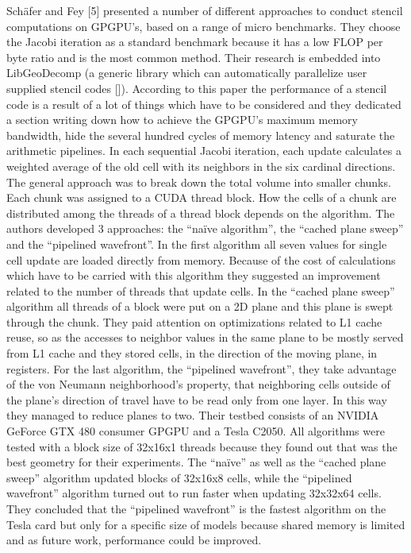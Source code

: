 Schäfer and Fey [5] presented a number of different approaches to conduct stencil computations on GPGPU’s, based on a range of micro benchmarks. They choose the Jacobi iteration as a standard benchmark because it has a low FLOP per byte ratio and is the most common method. Their research is embedded into LibGeoDecomp (a generic library which can automatically parallelize user supplied stencil codes []). According to this paper the performance of a stencil code is a result of a lot of things which have to be considered and they dedicated a section writing down how to achieve the GPGPU’s maximum memory bandwidth, hide the several hundred cycles of memory latency and saturate the arithmetic pipelines. In each sequential Jacobi iteration, each update calculates a weighted average of the old cell with its neighbors in the six cardinal directions. The general approach was to break down the total volume into smaller chunks. Each chunk was assigned to a CUDA thread block. How the cells of a chunk are distributed among the threads of a thread block depends on the algorithm. The authors developed 3 approaches: the “naïve algorithm”, the “cached plane sweep” and the “pipelined wavefront”. In the first algorithm all seven values for single cell update are loaded directly from memory. Because of the cost of calculations which have to be carried with this algorithm they suggested an improvement related to the number of threads that update cells. In the “cached plane sweep” algorithm all threads of a block were put on a 2D plane and this plane is swept through the chunk. They paid attention on optimizations related to L1 cache reuse, so as the accesses to neighbor values in the same plane to be mostly served from L1 cache and they stored cells, in the direction of the moving plane, in registers. For the last algorithm, the “pipelined wavefront”, they take advantage of the von Neumann neighborhood’s property, that neighboring cells outside of the plane’s direction of travel have to be read only from one layer. In this way they managed to reduce planes to two. Their testbed consists of an NVIDIA GeForce GTX 480 consumer GPGPU and a Tesla C2050. All algorithms were tested with a block size of 32x16x1 threads because they found out that was the best geometry for their experiments. The “naïve” as well as the “cached plane sweep” algorithm updated blocks of 32x16x8 cells, while the “pipelined wavefront” algorithm turned out to run faster when updating 32x32x64 cells. They concluded that the “pipelined wavefront” is the fastest algorithm on the Tesla card but only for a specific size of models because shared memory is limited and as future work, performance could be improved.  

